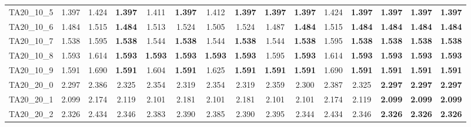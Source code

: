 \begin{tabular}{cc||ccccccccccccc}
TA20\_10\_5        & 1.397            & 1.424            & {\bf 1.397}      & 1.411            & {\bf 1.397}      & 1.412            & {\bf 1.397}      & {\bf 1.397}      & {\bf 1.397}      & 1.424            & {\bf 1.397}      & {\bf 1.397}      & {\bf 1.397}      & {\bf 1.397}     \\ 
TA20\_10\_6        & 1.484            & 1.515            & {\bf 1.484}      & 1.513            & 1.524            & 1.505            & 1.524            & 1.487            & {\bf 1.484}      & 1.515            & {\bf 1.484}      & {\bf 1.484}      & {\bf 1.484}      & {\bf 1.484}     \\ 
TA20\_10\_7        & 1.538            & 1.595            & {\bf 1.538}      & 1.544            & {\bf 1.538}      & 1.544            & {\bf 1.538}      & 1.544            & {\bf 1.538}      & 1.595            & {\bf 1.538}      & {\bf 1.538}      & {\bf 1.538}      & {\bf 1.538}     \\ 
TA20\_10\_8        & 1.593            & 1.614            & {\bf 1.593}      & {\bf 1.593}      & {\bf 1.593}      & {\bf 1.593}      & {\bf 1.593}      & 1.595            & {\bf 1.593}      & 1.614            & {\bf 1.593}      & {\bf 1.593}      & {\bf 1.593}      & {\bf 1.593}     \\ 
TA20\_10\_9        & 1.591            & 1.690            & {\bf 1.591}      & 1.604            & {\bf 1.591}      & 1.625            & {\bf 1.591}      & {\bf 1.591}      & {\bf 1.591}      & 1.690            & {\bf 1.591}      & {\bf 1.591}      & {\bf 1.591}      & {\bf 1.591}     \\ 
TA20\_20\_0        & 2.297            & 2.386            & 2.325            & 2.354            & 2.319            & 2.354            & 2.319            & 2.359            & 2.300            & 2.387            & 2.325            & {\bf 2.297}      & {\bf 2.297}      & {\bf 2.297}     \\ 
TA20\_20\_1        & 2.099            & 2.174            & 2.119            & 2.101            & 2.181            & 2.101            & 2.181            & 2.101            & 2.101            & 2.174            & 2.119            & {\bf 2.099}      & {\bf 2.099}      & {\bf 2.099}     \\ 
TA20\_20\_2        & 2.326            & 2.434            & 2.346            & 2.383            & 2.390            & 2.385            & 2.390            & 2.395            & 2.344            & 2.434            & 2.346            & {\bf 2.326}      & {\bf 2.326}      & {\bf 2.326}     \\ 

\end{tabular}
